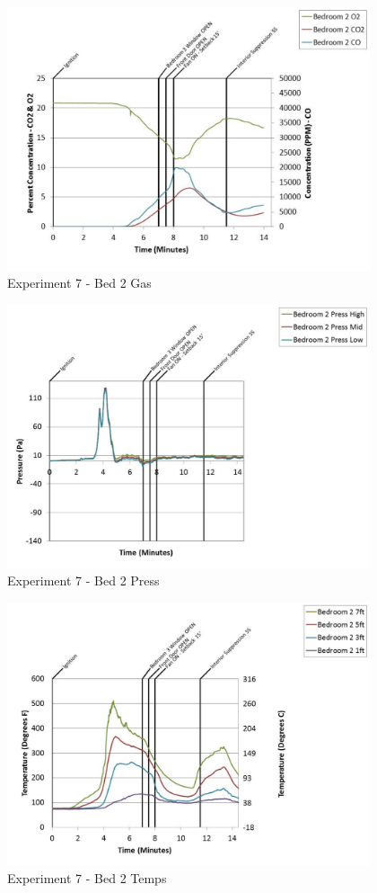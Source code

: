 \documentclass{article}
\begin{document}
\begin{appendices}
	\clearpage

	\begin{figure}[h!]
		\centering
		\includegraphics[height=3.05in]{0_Images/Results_Charts/Exp_7_Charts/Bed2Gas.pdf}
		\caption{Experiment 7 - Bed 2 Gas}
	\end{figure}
 

	\begin{figure}[h!]
		\centering
		\includegraphics[height=3.05in]{0_Images/Results_Charts/Exp_7_Charts/Bed2Press.pdf}
		\caption{Experiment 7 - Bed 2 Press}
	\end{figure}
 
	\clearpage

	\begin{figure}[h!]
		\centering
		\includegraphics[height=3.05in]{0_Images/Results_Charts/Exp_7_Charts/Bed2Temps.pdf}
		\caption{Experiment 7 - Bed 2 Temps}
	\end{figure}
 


\end{appendices}
\end{document}
